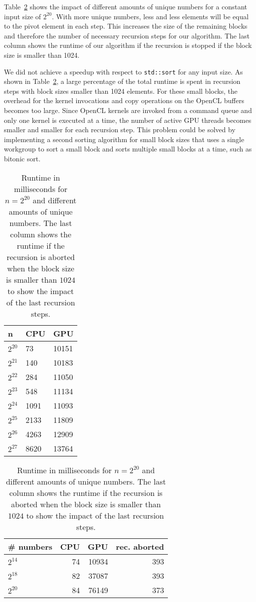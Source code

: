 \documentclass{llncs}
\begin{document}
Table~\ref{tbl:unique_numbers} shows the impact of different amounts of unique numbers for a constant input size of $2^{20}$. With more unique numbers, less and less elements will be equal to the pivot element in each step. This increases the size of the remaining blocks and therefore the number of necessary recursion steps for our algorithm. The last column shows the runtime of our algorithm if the recursion is stopped if the block size is smaller than 1024.

We did not achieve a speedup with respect to \texttt{std::sort} for any input size. As shown in Table~\ref{tbl:unique_numbers}, a large percentage of the total runtime is spent in recursion steps with block sizes smaller than 1024 elements. For these small blocks, the overhead for the kernel invocations and copy operations on the OpenCL buffers becomes too large. Since OpenCL kernels are invoked from a command queue and only one kernel is executed at a time, the number of active GPU threads becomes smaller and smaller for each recursion step. This problem could be solved by implementing a second sorting algorithm for small block sizes that uses a single workgroup to sort a small block and sorts multiple small blocks at a time, such as bitonic sort. 

\begin{table}
\parbox{.45\linewidth}{
\centering

\begin{tabular}{@{}lll@{}}
\toprule
n         & CPU  & GPU   \\ \midrule
$2^{20}$    & 73   & 10151 \\
$2^{21}$    & 140  & 10183 \\
$2^{22}$   & 284  & 11050 \\
$2^{23}$    & 548  & 11134 \\
$2^{24}$  & 1091 & 11093 \\
$2^{25}$   & 2133 & 11809 \\
$2^{26}$   & 4263 & 12909 \\
$2^{27}$ & 8620 & 13764 \\ \bottomrule
\end{tabular}
\caption{Runtime in milliseconds of the QuickSort algorithm with $2^{14}$ different numbers.}
\label{tbl:input_size}
}
\hfill
\parbox{.45\linewidth}{
\centering
\begin{tabular}{@{}lrrr@{}}
\toprule
\# numbers       & CPU & GPU   & rec. aborted    \\ \midrule
$2^{14}$   & 74  & 10934 & 393 \\
$2^{18}$  & 82  & 37087 & 393 \\
$2^{20}$ & 84  & 76149 & 373 \\ \bottomrule
\end{tabular}
\caption{Runtime in milliseconds for $n=2^{20}$ and different amounts of unique numbers. The last column shows the runtime if the recursion is aborted when the block size is smaller than $1024$ to show the impact of the last recursion steps.}
\label{tbl:unique_numbers}
}
\end{table}


%
%
\end{document}
